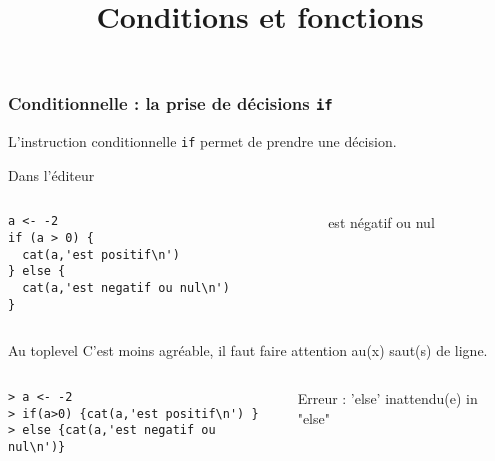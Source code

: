 \documentclass[10pt]{beamer}
\title{Conditions et fonctions}
\begin{document}
\maketitle


\begin{frame}[fragile]
  \frametitle{Conditionnelle : la prise de décisions \texttt{if}}
  \alert{L'instruction conditionnelle \texttt{if} permet de prendre une décision.}

  \begin{block}{Dans l'éditeur}
    \begin{columns}[c]
      \begin{column}{0.53\textwidth}
  \begin{lstlisting}[style=editor]
a <- -2
if (a > 0) {
  cat(a,'est positif\n')
} else {
  cat(a,'est negatif ou nul\n')
}
\end{lstlisting}

\end{column}
\begin{column}{0.47\textwidth}
   est négatif ou nul
\end{column}
\end{columns}
  \end{block}



\begin{block}{Au toplevel}
  C'est moins agréable, il faut faire attention au(x) saut(s) de ligne.
\end{block}
\begin{columns}[c]
\begin{column}{0.65\textwidth}
  \begin{lstlisting}
> a <- -2
> if(a>0) {cat(a,'est positif\n') }
> else {cat(a,'est negatif ou nul\n')}
  \end{lstlisting}
\end{column}
\begin{column}{0.35\textwidth}
  \RUN
  \alert{Erreur : 'else' inattendu(e) in "else"}
\end{column}
\end{columns}
\end{frame}
\end{document}

